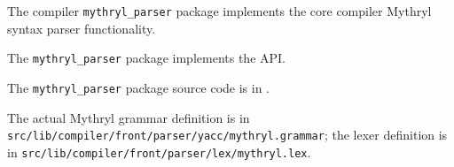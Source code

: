
The compiler {\tt mythryl\_parser} package implements the core compiler Mythryl syntax 
parser functionality.

The {\tt mythryl\_parser} package implements the  API.

The {\tt mythryl\_parser} package source code is in .

The actual Mythryl grammar definition is in 
{\tt src/lib/compiler/front/parser/yacc/mythryl.grammar}; the lexer definition is in 
{\tt src/lib/compiler/front/parser/lex/mythryl.lex}.
